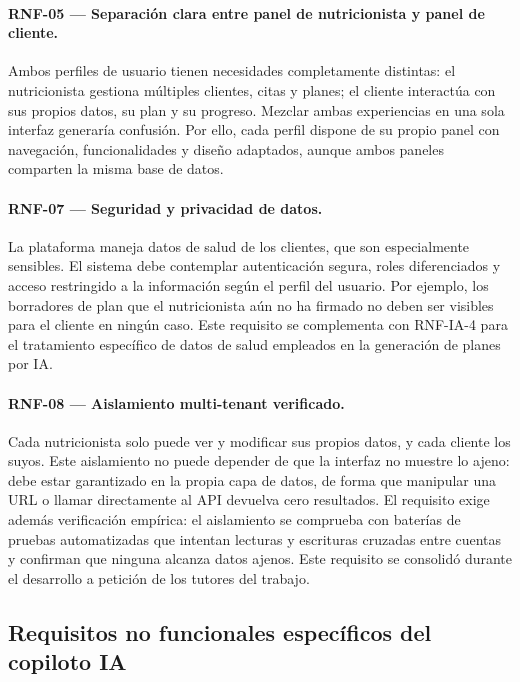 \paragraph{RNF-05 --- Separación clara entre panel de nutricionista y panel de cliente.}
Ambos perfiles de usuario tienen necesidades completamente distintas: el nutricionista gestiona múltiples clientes, citas y planes; el cliente interactúa con sus propios datos, su plan y su progreso. Mezclar ambas experiencias en una sola interfaz generaría confusión. Por ello, cada perfil dispone de su propio panel con navegación, funcionalidades y diseño adaptados, aunque ambos paneles comparten la misma base de datos.

\paragraph{RNF-07 --- Seguridad y privacidad de datos.}
La plataforma maneja datos de salud de los clientes, que son especialmente sensibles. El sistema debe contemplar autenticación segura, roles diferenciados y acceso restringido a la información según el perfil del usuario. Por ejemplo, los borradores de plan que el nutricionista aún no ha firmado no deben ser visibles para el cliente en ningún caso. Este requisito se complementa con RNF-IA-4 para el tratamiento específico de datos de salud empleados en la generación de planes por IA.

\paragraph{RNF-08 --- Aislamiento multi-tenant verificado.}
Cada nutricionista solo puede ver y modificar sus propios datos, y cada cliente los suyos. Este aislamiento no puede depender de que la interfaz no muestre lo ajeno: debe estar garantizado en la propia capa de datos, de forma que manipular una URL o llamar directamente al API devuelva cero resultados. El requisito exige además verificación empírica: el aislamiento se comprueba con baterías de pruebas automatizadas que intentan lecturas y escrituras cruzadas entre cuentas y confirman que ninguna alcanza datos ajenos. Este requisito se consolidó durante el desarrollo a petición de los tutores del trabajo.

\subsection{Requisitos no funcionales específicos del copiloto IA}

